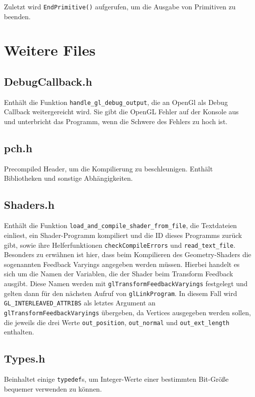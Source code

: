 Zuletzt wird \lstinline{EndPrimitive()} aufgerufen, um die Ausgabe von Primitiven zu beenden.

\chapter{Weitere Files}
\section{DebugCallback.h}
Enthält die Funktion \lstinline{handle_gl_debug_output}, die an OpenGl als Debug Callback weitergereicht wird. Sie gibt die OpenGL Fehler auf der Konsole aus und unterbricht das Programm, wenn die Schwere des Fehlers zu hoch ist.

\section{pch.h}
Precompiled Header, um die Kompilierung zu beschleunigen. Enthält Bibliotheken und sonstige Abhängigkeiten.

\section{Shaders.h}
Enthält die Funktion \lstinline{load_and_compile_shader_from_file}, die Textdateien einliest, ein Shader-Programm kompiliert und die ID dieses Programms zurück gibt, sowie ihre Helferfunktionen \lstinline{checkCompileErrors} und \lstinline{read_text_file}. Besonders zu erwähnen ist hier, dass beim Kompilieren des Geometry-Shaders die sogenannten Feedback Varyings angegeben werden müssen. Hierbei handelt es sich um die Namen der Variablen, die der Shader beim Transform Feedback ausgibt. Diese Namen werden mit \lstinline{glTransformFeedbackVaryings} festgelegt und gelten dann für den nächsten Aufruf von \lstinline{glLinkProgram}. In diesem Fall wird \lstinline{GL_INTERLEAVED_ATTRIBS} als letztes Argument an \lstinline{glTransformFeedbackVaryings} übergeben, da Vertices ausgegeben werden sollen, die jeweils die drei Werte \lstinline{out_position}, \lstinline{out_normal} und \lstinline{out_ext_length} enthalten.

\section{Types.h}
Beinhaltet einige \lstinline{typedef}s, um Integer-Werte einer bestimmten Bit-Größe bequemer verwenden zu können.

